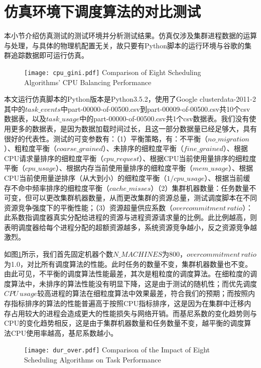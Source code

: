 \section{仿真环境下调度算法的对比测试}

本小节介绍仿真测试的测试环境并分析测试结果。仿真仅涉及集群进程数据的运算与处理，与具体的物理机配置无关，故只要有Python脚本的运行环境与谷歌的集群追踪数据即可运行仿真。

\begin{figure}[!htp]
  \centering
  \texttt{[image: cpu\_gini.pdf]}
    {Comparison of Eight Scheduling Algorithms' CPU Balancing Performance}
  \label{fig:cpu_gini}
\end{figure}
本文运行仿真脚本的Python版本是Python3.5.2，使用了Google clusterdata-2011-2其中的$task\_events$中part-00000-of-00500.csv到part-00009-of-00500.csv共10个csv数据表，以及$task\_usage$中的part-00000-of-00500.csv共1个csv数据表。我们没有使用更多的数据表，是因为数据加载时间过长，且这一部分数据量已经足够大，具有很好的代表性。测试的可变参数有：（1）平衡策略，有：不平衡（$no\_migration$）、粗粒度平衡（$coarse\_grained$）、未排序的细粒度平衡（$fine\_grained$）、根据CPU请求量排序的细粒度平衡（$cpu\_request$）、根据CPU当前使用量排序的细粒度平衡（$cpu\_usage$）、根据内存当前使用量排序的细粒度平衡（$mem\_usage$）、根据CPU当前使用量逆排序（从大到小）的细粒度平衡（$1/cpu\_usage$）、根据当前缓存不命中频率排序的细粒度平衡（$cache\_misses$）（2）集群机器数量：任务数量不可变，但可以更改集群机器数量，从而更改集群的资源总量，测试调度脚本在不同资源竞争强度下的平衡性能；（3）资源超量供应系数（$overcommitment\,ratio$）：此系数指调度器真实分配给进程的资源与进程资源请求量的比例。此比例越高，则表明调度器给每个进程分配的超额资源越多，系统资源竞争越小，反之资源竞争越激烈。

如图\ref{fig:cpu_gini}所示，我们首先固定机器个数$N\_MACHINES$为800，$overcommitment\,ratio$为1.0，对比所有调度算法的性能。此时任务的数量不变，集群机器数量也不变。由此可见，不平衡的调度算法性能最差，其次是粗粒度的调度算法。在细粒度的调度算法中，未排序的算法性能没有明显下降，这是由于测试的随机性；而优先调度$CPU\,usage$较高进程的算法在细粒度算法中效果最差，符合我们的预期；而按照内存指标排序的算法的性能普遍高于按照CPU指标排序，这是因为在集群中迁移内存占用较大的进程会造成更大的性能损失与网络开销。而基尼系数的变化趋势则与CPU的变化趋势相反，这是由于集群机器数量和任务数量不变，越平衡的调度算法CPU使用率越高，基尼系数越小。

\begin{figure}[!htp]
  \centering
  \texttt{[image: dur\_over.pdf]}
    {Comparison of the Impact of Eight Scheduling Algorithms on Task Performance}
  \label{fig:dur_over}
\end{figure}

